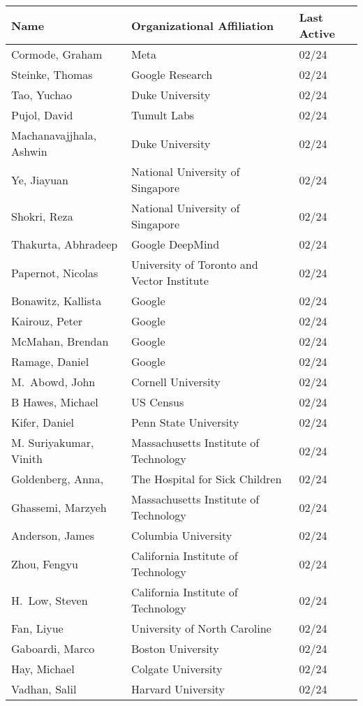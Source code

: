 \documentclass[localFont,alternative]{documentMETADATA}
\begin{document}
\iffalse
{}
\centering
\begin{tabular}{lll}
\toprule
\textbf{Name} & \textbf{Organizational Affiliation} & \textbf{Last Active} \\
\midrule
	 Cormode, Graham & Meta  	& 02/24\\
	 Steinke, Thomas & Google Research 	& 02/24\\
	 Tao, Yuchao & Duke University 	& 02/24\\
	 Pujol, David & Tumult Labs 	& 02/24\\
	 Machanavajjhala, Ashwin & Duke University 	& 02/24\\
	 Ye, Jiayuan & National University of Singapore 	& 02/24\\
	 Shokri, Reza & National University of Singapore 	& 02/24\\
	  Thakurta, Abhradeep & Google DeepMind  	& 02/24\\
	 Papernot, Nicolas & University of Toronto and Vector Institute 	& 02/24\\
	 Bonawitz, Kallista & Google 	& 02/24\\
	 Kairouz, Peter & Google 	& 02/24\\
	 McMahan, Brendan & Google 	& 02/24\\
	 Ramage, Daniel & Google  	& 02/24\\
	 M.~Abowd, John & Cornell University 	& 02/24\\
	 B Hawes, Michael & US Census 	& 02/24\\
	  Kifer, Daniel & Penn State University 	& 02/24\\
	  M. Suriyakumar, Vinith & Massachusetts Institute of Technology 	& 02/24\\
	 Goldenberg, Anna, & The Hospital for Sick Children 	& 02/24\\
	 Ghassemi, Marzyeh & Massachusetts Institute of Technology 	& 02/24\\
	 Anderson, James & Columbia University 	& 02/24\\
	 Zhou, Fengyu & California Institute of Technology 	& 02/24\\
	 H.~Low, Steven & California Institute of Technology 	& 02/24\\
	 Fan, Liyue & University of North Caroline 	& 02/24\\
	 Gaboardi, Marco & Boston University 	& 02/24\\
	 Hay, Michael & Colgate University 	& 02/24\\
	 Vadhan, Salil & Harvard University 	& 02/24\\

\end{tabular}
\end{document}
